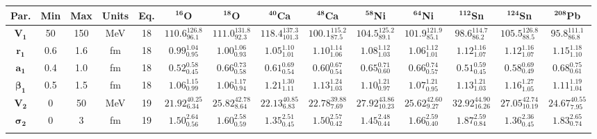 \bgroup
\def\arraystretch{1.5}%
\begin{tabular}{ c c c c c c c c c c c c c c} 
\textbf{Par.} & \textbf{Min} & \textbf{Max} &                \textbf{Units} & \textbf{Eq.}& \textbf{$\mathbf{^{16}}$O}& \textbf{$\mathbf{^{18}}$O}& \textbf{$\mathbf{^{40}}$Ca}& \textbf{$\mathbf{^{48}}$Ca}& \textbf{$\mathbf{^{58}}$Ni}& \textbf{$\mathbf{^{64}}$Ni}& \textbf{$\mathbf{^{112}}$Sn}& \textbf{$\mathbf{^{124}}$Sn}& \textbf{$\mathbf{^{208}}$Pb}\\
 \hline 
$\mathbf{V_{1}}$ & 50 & 150 & MeV & 18 & $110.6^{126.8}_{96.1}$ & $111.0^{131.8}_{92.3}$ & $118.4^{137.3}_{101.3}$ & $100.1^{115.2}_{87.5}$ & $104.5^{125.2}_{89.1}$ & $101.9^{121.9}_{85.1}$ & $98.6^{114.7}_{86.2}$ & $105.5^{126.8}_{88.5}$ & $95.8^{111.1}_{86.8}$\\ 
$\mathbf{r_{1}}$ & 0.6 & 1.6 & fm & 18 & $0.99^{1.04}_{0.95}$ & $1.00^{1.06}_{0.93}$ & $1.05^{1.10}_{1.01}$ & $1.10^{1.14}_{1.06}$ & $1.08^{1.12}_{1.03}$ & $1.06^{1.12}_{1.01}$ & $1.12^{1.16}_{1.07}$ & $1.12^{1.16}_{1.07}$ & $1.15^{1.18}_{1.10}$\\ 
$\mathbf{a_{1}}$ & 0.4 & 1.0 & fm & 18 & $0.52^{0.58}_{0.45}$ & $0.66^{0.73}_{0.58}$ & $0.61^{0.69}_{0.54}$ & $0.60^{0.67}_{0.54}$ & $0.65^{0.71}_{0.60}$ & $0.66^{0.74}_{0.57}$ & $0.51^{0.59}_{0.45}$ & $0.58^{0.69}_{0.49}$ & $0.68^{0.75}_{0.61}$\\ 
$\mathbf{\beta_{1}}$ & 0.5 & 1.5 & fm & 18 & $1.06^{1.15}_{0.99}$ & $1.06^{1.17}_{0.94}$ & $1.21^{1.30}_{1.11}$ & $1.13^{1.24}_{1.03}$ & $1.10^{1.21}_{0.97}$ & $1.07^{1.21}_{0.95}$ & $1.13^{1.21}_{1.03}$ & $1.16^{1.27}_{1.05}$ & $1.11^{1.19}_{1.04}$\\ 
$\mathbf{V_{2}}$ & 0 & 50 & MeV & 19 & $21.92^{40.25}_{6.34}$ & $25.82^{42.78}_{8.64}$ & $22.13^{40.85}_{6.83}$ & $22.78^{39.88}_{7.69}$ & $27.92^{43.86}_{10.23}$ & $25.62^{42.60}_{9.27}$ & $32.92^{44.90}_{16.26}$ & $27.05^{42.74}_{10.19}$ & $24.67^{40.55}_{7.95}$\\ 
$\mathbf{\sigma_{2}}$ & 0 & 3 & fm & 19 & $1.50^{2.64}_{0.56}$ & $1.60^{2.58}_{0.59}$ & $1.35^{2.51}_{0.45}$ & $1.50^{2.57}_{0.42}$ & $1.45^{2.48}_{0.44}$ & $1.66^{2.59}_{0.40}$ & $1.87^{2.59}_{0.84}$ & $1.36^{2.36}_{0.45}$ & $1.83^{2.65}_{0.74}$\\ 
\\ 
\end{tabular}
\egroup
